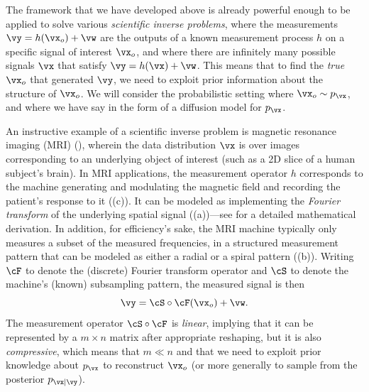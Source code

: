 \documentclass[../../book-main.tex]{subfiles}
\begin{document}
The framework that we have developed above is already powerful enough to be
applied to solve various \textit{scientific inverse problems}, where the measurements
$\vy = h(\vx_o) + \vw$ are the outputs of a known measurement process $h$ on
a specific signal of interest $\vx_o$, and where there are infinitely many
possible signals $\vx$ that satisfy $\vy = h(\vx) + \vw$. This means that to
find the \textit{true} $\vx_o$ that generated $\vy$, we need to exploit prior
information about the structure of $\vx_o$.
We will consider the probabilistic setting where $\vx_o \sim p_{\vx}$, and where
we have say in the form of a diffusion model for $p_{\vx}$.

An instructive example of a scientific inverse problem is magnetic resonance
imaging (MRI) (), wherein the data distribution
$\vx$ is over images corresponding to an underlying object of interest (such as
a 2D slice of a human subject's brain). In MRI applications, the measurement
operator $h$ corresponds to the machine generating and modulating the magnetic
field and recording the patient's response to it
((c)). It can be modeled as implementing the
\textit{Fourier transform} of the underlying spatial signal
((a))---see \cite[Chapter 10]{Wright-Ma-2022} for
a detailed mathematical derivation.
In addition, for efficiency's sake, the MRI machine typically only measures
a subset of the measured frequencies, in a structured measurement pattern that
can be modeled as either a radial or a spiral pattern
((b)). Writing $\cF$ to denote the (discrete) Fourier
transform operator and $\cS$ to denote the machine's (known) subsampling
pattern, the measured signal is then
\begin{equation}\label{eq:mri-measurement}
  \vy = \cS \circ \cF(\vx_o) + \vw.
\end{equation}
The measurement operator $\cS \circ \cF$ is \textit{linear}, implying that it
can be represented by a $m \times n$ matrix after appropriate reshaping, but it
is also \textit{compressive}, which means that $m \ll n$ and that we need to
exploit prior knowledge about $p_{\vx}$ to reconstruct $\vx_o$ (or more
generally to sample from the posterior $p_{\vx \mid \vy}$). 
\end{document}
